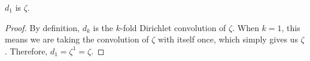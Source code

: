 \begin{theorem}[d one]
\label{d_one}
\leanok
$d_1$ is $\zeta$.
\end{theorem}
\begin{proof}
\leanok
By definition, $d_k$ is the $k$-fold Dirichlet convolution of $\zeta$. When $k = 1$, this means we are taking the convolution of $\zeta$ with itself once, which simply gives us $\zeta$. Therefore, $d_1 = \zeta^1 = \zeta$.
\end{proof}
